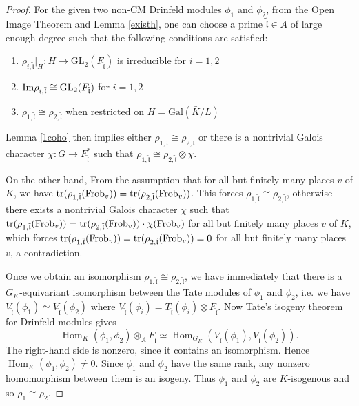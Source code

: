 \documentclass[20pt, oneside]{article}   	%
\theoremstyle{definition}
\newcommand{\fl}{\mathfrak{l}}
\newcommand{\Gal}{\mathrm{Gal}}
\newcommand{\GL}{\mathrm{GL}}
\begin{document}
\begin{proof}
For the given two non-CM Drinfeld modules $\phi_1$ and $\phi_2$, from the Open Image Theorem and Lemma \ref{existh}, one can choose a prime $\tilde{\fl}\in A$ of large enough degree such that the following conditions are satisfied:
\begin{enumerate}
\item $\rho_{i,\tilde{\fl}}|_H:H\rightarrow \GL_2(F_{\tilde{\fl}})$ is irreducible for $i=1,2$
\item ${\rm Im}\rho_{i,\tilde{\fl}}\cong \GL_2(F_{\tilde{\fl}})$ for $i=1,2$
\item $\rho_{1,\tilde{\fl}}\cong\rho_{2,\tilde{\fl}}$ when restricted on $H=\Gal(\bar{K}/L)$
\end{enumerate}

Lemma \ref{1coho} then implies either $\rho_{1,\tilde{\fl}}\cong\rho_{2,\tilde{\fl}}$ or there is a nontrivial Galois character $\chi:G\rightarrow F_{\tilde{\fl}}^*$ such that $\rho_{1,\tilde{\fl}}\cong\rho_{2,\tilde{\fl}}\otimes\chi$. 

On the other hand, From the assumption that for all but finitely many places $v$ of $K$, we have ${\rm tr}(\rho_{1, \tilde{\fl}}({\rm Frob}_v))={\rm tr}(\rho_{2, \tilde{\fl}}({\rm Frob}_v))$. This forces $\rho_{1,\tilde{\fl}}\cong\rho_{2,\tilde{\fl}}$, otherwise there exists a nontrivial Galois character $\chi$ such that ${\rm tr}(\rho_{1, \tilde{\fl}}({\rm Frob}_v))={\rm tr}(\rho_{2, \tilde{\fl}}({\rm Frob}_v))\cdot \chi({\rm Frob}_v)$ for all but finitely many places $v$ of $K$, which forces ${\rm tr}(\rho_{1, \tilde{\fl}}({\rm Frob}_v))={\rm tr}(\rho_{2, \tilde{\fl}}({\rm Frob}_v))=0$ for all but finitely many places $v$, a contradiction.


Once we obtain an isomorphism $\rho_{1,\tilde{\fl}}\cong\rho_{2,\tilde{\fl}}$, we have immediately that there is a $G_K$-equivariant isomorphism between the Tate modules of $\phi_1$ and $\phi_2$, i.e. we have $V_{\tilde{\fl}}(\phi_1)\simeq V_{\tilde{\fl}}(\phi_2)$ where $V_{\tilde{\fl}}(\phi_i)=T_{\tilde{\fl}}(\phi_i)\otimes F_{\tilde{\fl}}$. Now Tate's isogeny theorem for Drinfeld modules gives
\[
\operatorname{Hom}_K(\phi_1,\phi_2)\otimes_A F_{\tilde{\fl}}
\simeq
\operatorname{Hom}_{G_K}(V_{\tilde{\fl}}(\phi_1),V_{\tilde{\fl}}(\phi_2)).
\]
The right-hand side is nonzero, since it contains an isomorphism. Hence $\operatorname{Hom}_K(\phi_1,\phi_2)\neq 0.$ Since \(\phi_1\) and \(\phi_2\) have the same rank, any nonzero homomorphism between them is an isogeny. Thus \(\phi_1\) and \(\phi_2\) are \(K\)-isogenous and so $\rho_1\cong\rho_2$.



\end{proof}
\end{document}

